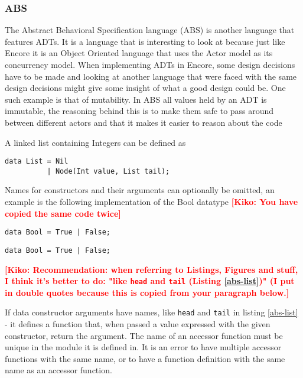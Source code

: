 \documentclass[10pt]{report}
\newcommand{\KIKO}[1]{\textcolor{red}{\textbf{[Kiko: #1]}}}
\def\code#1{\texttt{#1}} %
\begin{document}
\subsubsection{ABS}
\par{The Abstract Behavioral Specification language\cite{ABS} (ABS) is another language that features ADTs. It is a language that is interesting to look at because just like Encore it is an Object Oriented language that uses the Actor model as its concurrency model. When implementing ADTs in Encore, some design decisions have to be made and looking at another language that were faced with the same design decisions might give some insight of what a good design could be. One such example is that of mutability. In ABS all values held by an ADT is immutable, the reasoning behind this is to make them safe to pass around between different actors and that it makes it easier to reason about the code\cite{ABSmut}}
\par{A linked list containing Integers can be defined as}
\begin{lstlisting}[language=encore,caption={Linked list in ABS}]
data List = Nil
          | Node(Int value, List tail);
\end{lstlisting}
\par{Names for constructors and their arguments can optionally be omitted, an example is the following implementation of the Bool datatype}
\KIKO{You have copied the same code twice}
\begin{lstlisting}[language=encore,caption={Actual definition of built-in type Bool},label=test-kiko]
data Bool = True | False;
\end{lstlisting}

\begin{lstlisting}[language=encore,caption={Actual definition of built-in type Bool}]
data Bool = True | False;
\end{lstlisting}

\KIKO{Recommendation: when referring to Listings, Figures and stuff, I think it's better to do:
"like \code{head} and \code{tail} (Listing \ref{abs-list})"  (I put in double quotes because this is copied from your paragraph below.}

\par{If data constructor arguments have names, like \code{head} and \code{tail} in listing \ref{abs-list} - it defines a function that, when passed a value expressed with the given constructor, return the argument.  The name of an accessor function must be unique in the module it is defined in. It is an error to have multiple accessor functions with the same name, or to have a function definition with the same name as an accessor function.}
\end{document}
